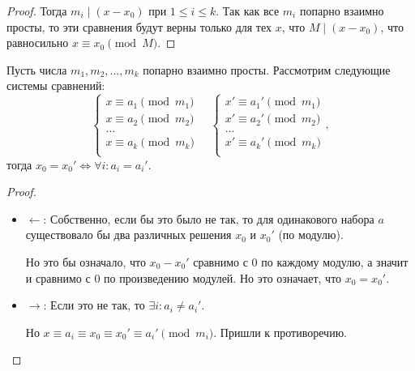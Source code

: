 \documentclass[a4paper]{article}
\theoremstyle{named}
\begin{document}
\begin{colloq}
\begin{proof}
            Тогда $m_i \mid (x - x_0)$ при $1 \leq i \leq k$. Так как все $m_i$ попарно взаимно просты, то эти сравнения будут верны только для тех $x$, что $M \mid (x - x_0)$, что равносильно $x \equiv x_0 \pmod M$.
        \end{proof}

        \begin{theorem*}
            Пусть числа $m_1, m_2, \dots, m_k$ попарно взаимно просты. Рассмотрим следующие системы сравнений:
            \begin{equation*}
                \begin{cases}
                    x \equiv a_1 \pmod{m_1} \\
                    x \equiv a_2 \pmod{m_2} \\
                    \dots \\
                    x \equiv a_k \pmod{m_k} \\
                \end{cases}
                \quad
                \begin{cases}
                    x' \equiv a_1' \pmod{m_1} \\
                    x' \equiv a_2' \pmod{m_2} \\
                    \dots \\
                    x' \equiv a_k' \pmod{m_k} \\
                \end{cases},
            \end{equation*}
            тогда $x_0 = x_0' \iff \forall i : a_i = a_i'$.
        \end{theorem*}

        \begin{proof}
            \begin{itemize}
            \item $\leftarrow$: 
                Собственно, если бы это было не так, то для одинакового набора $a$ существовало бы два различных решения $x_0$ и $x_0'$ (по модулю).

                Но это бы означало, что $x_0 - x_0'$ сравнимо с $0$ по каждому модулю, а значит и сравнимо с $0$ по произведению модулей. Но это означает, что $x_0 = x_0'$.

            \item $\rightarrow$:
                Если это не так, то $\exists i: a_i \neq a_i'$. 
                
                Но $x \equiv a_i \equiv x_0 \equiv x_0' \equiv a_i' \pmod{m_i}$. Пришли к противоречию.
            \end{itemize}
        \end{proof}


\end{colloq}
\end{document}
